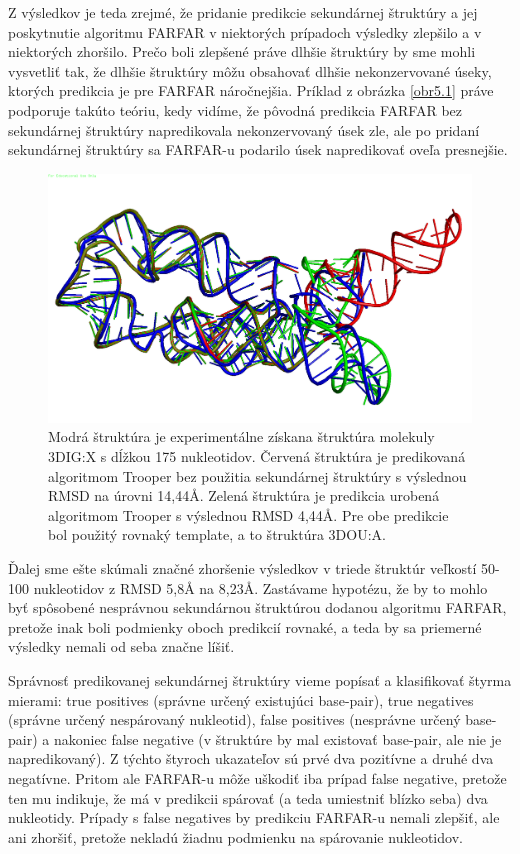 \indent Z výsledkov je teda zrejmé, že pridanie predikcie sekundárnej štruktúry a jej poskytnutie algoritmu FARFAR v niektorých prípadoch výsledky zlepšilo a v niektorých zhoršilo. Prečo boli zlepšené práve dlhšie štruktúry by sme mohli vysvetliť tak, že dlhšie štruktúry môžu obsahovať dlhšie nekonzervované úseky, ktorých predikcia je pre FARFAR náročnejšia. Príklad z obrázka \autoref{obr5.1} práve podporuje takúto teóriu, kedy vidíme, že pôvodná predikcia FARFAR bez sekundárnej štruktúry napredikovala nekonzervovaný úsek zle, ale po pridaní sekundárnej štruktúry sa FARFAR-u podarilo úsek napredikovať oveľa presnejšie.
\begin{figure}%
\includegraphics[width=\textwidth]{../img/struct1}
\caption{Modrá štruktúra je experimentálne získana štruktúra molekuly 3DIG:X s dĺžkou 175 nukleotidov. Červená štruktúra je predikovaná algoritmom Trooper bez použitia sekundárnej štruktúry s výslednou RMSD na úrovni 14,44Å. Zelená štruktúra je predikcia urobená algoritmom Trooper s výslednou RMSD 4,44Å. Pre obe predikcie bol použitý rovnaký template, a to štruktúra 3DOU:A.}
\label{obr5.1}
\end{figure}


\indent Ďalej sme ešte skúmali značné zhoršenie výsledkov v triede štruktúr veľkostí 50-100 nukleotidov z RMSD 5,8Å na 8,23Å. Zastávame hypotézu, že by to mohlo byť spôsobené nesprávnou sekundárnou štruktúrou dodanou algoritmu FARFAR, pretože inak boli podmienky oboch predikcií rovnaké, a teda by sa priemerné výsledky nemali od seba značne líšiť.


\indent Správnosť predikovanej sekundárnej štruktúry vieme popísať a klasifikovať štyrma mierami: true positives (správne určený existujúci base-pair), true negatives (správne určený nespárovaný nukleotid), false positives (nesprávne určený base-pair) a nakoniec false negative (v štruktúre by mal existovať base-pair, ale nie je napredikovaný). Z týchto štyroch ukazateľov sú prvé dva pozitívne a druhé dva negatívne. Pritom ale FARFAR-u môže uškodiť iba prípad false negative, pretože ten mu indikuje, že má v predikcii spárovať (a teda umiestniť blízko seba) dva nukleotidy. Prípady s false negatives by predikciu FARFAR-u nemali zlepšiť, ale ani zhoršiť, pretože nekladú žiadnu podmienku na spárovanie nukleotidov. 


